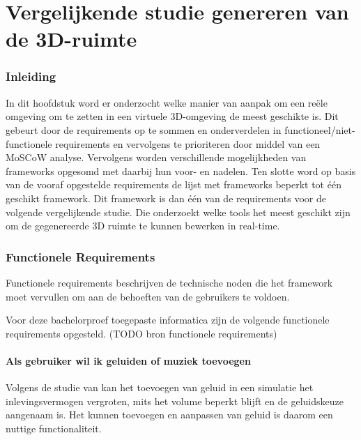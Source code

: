 
\chapter{Vergelijkende studie genereren van de 3D-ruimte}%
\label{ch:requirements1}

\subsection{Inleiding}

In dit hoofdstuk word er onderzocht welke manier van aanpak om een reële omgeving om te zetten in een virtuele 3D-omgeving de meest geschikte is. Dit gebeurt door de requirements op te sommen en onderverdelen in functioneel/niet-functionele requirements en vervolgens te prioriteren door middel van een MoSCoW analyse.
Vervolgens worden verschillende mogelijkheden van frameworks opgesomd met daarbij hun voor- en nadelen.
Ten slotte word op basis van de vooraf opgestelde requirements de lijst met frameworks beperkt tot één geschikt framework.
Dit framework is dan één van de requirements voor de volgende vergelijkende studie. Die onderzoekt welke tools het meest geschikt zijn om de gegenereerde 3D ruimte te kunnen bewerken in real-time.

\subsection{Functionele Requirements}

Functionele requirements beschrijven de technische noden die het framework moet vervullen om aan de  behoeften van de gebruikers te voldoen.

 Voor deze bachelorproef toegepaste informatica zijn de volgende functionele requirements opgesteld. (TODO bron functionele requirements)

\subsubsection{Als gebruiker wil ik geluiden of muziek toevoegen}

Volgens de studie van \textcite{Raes2023} kan het toevoegen van geluid in een simulatie het inlevingsvermogen vergroten, mits het volume beperkt blijft en de geluidskeuze aangenaam is. Het kunnen toevoegen en aanpassen van geluid is daarom een nuttige functionaliteit.

